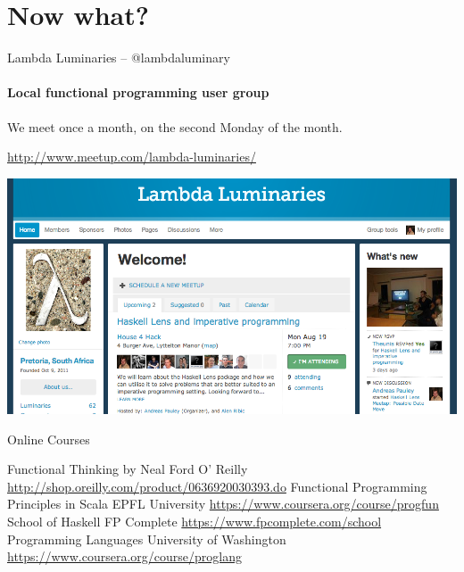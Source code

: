 \documentclass{beamer}
\begin{document}
\section{Now what?}

\begin{frame}{Lambda Luminaries -- @lambdaluminary}
  \framesubtitle{Local functional programming user group}
  We meet once a month, on the second Monday of the month.

  \url{http://www.meetup.com/lambda-luminaries/}
  \begin{center}
    \includegraphics[scale=0.3]{img/LambdaLuminariesScreenShot2013-08-09.png}
  \end{center}
\end{frame}

\begin{frame}{Online Courses}

  \begin{thebibliography}{10}
      Functional Thinking by Neal Ford
      \newblock O' Reilly
      \newblock \url{http://shop.oreilly.com/product/0636920030393.do}
      Functional Programming Principles in Scala
      \newblock EPFL University
      \newblock \url{https://www.coursera.org/course/progfun}
      School of Haskell
      \newblock FP Complete
      \newblock \url{https://www.fpcomplete.com/school}
      Programming Languages
      \newblock University of Washington
      \newblock \url{https://www.coursera.org/course/proglang}
  \end{thebibliography}

\end{frame}
\end{document}
